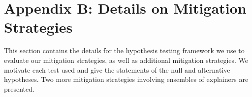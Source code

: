 \documentclass[mnsc,blindrev]{informs3}
\begin{document}
    
    
    
   

    
    
    
    
    
    
   
    
    
    \section*{Appendix B: Details on Mitigation Strategies}
        \label{apx_sec:mitigation_details}
        This section contains the details for the hypothesis testing framework we use to evaluate our mitigation strategies, as well as additional mitigation strategies. We motivate each test used and give the statements of the null and alternative hypotheses. Two more mitigation strategies involving ensembles of explainers are presented. 
        
\end{document}
